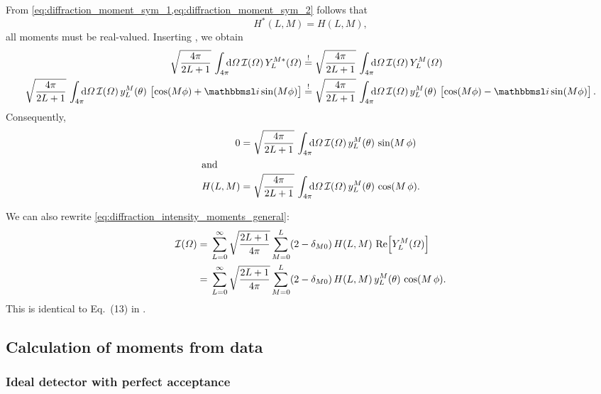 From \cref{eq:diffraction_moment_sym_1,eq:diffraction_moment_sym_2} follows that
\begin{equation}
  H^*(L, M) = H(L, M),
\end{equation}
\ie all moments must be real-valued.  Inserting
, we obtain
\begin{align}
  \sqrt{\frac{4 \pi}{2 L + 1}}\, \int_{4 \pi}\!\!\! \dif{\Omega}\, \mathcal{I}(\Omega)\, Y_L^{M *}(\Omega)
  \mustBeEq{}&
  \sqrt{\frac{4 \pi}{2 L + 1}}\, \int_{4 \pi}\!\!\! \dif{\Omega}\, \mathcal{I}(\Omega)\, Y_L^M(\Omega) \\
  \sqrt{\frac{4 \pi}{2 L + 1}}\, \int_{4 \pi}\!\!\! \dif{\Omega}\, \mathcal{I}(\Omega)\, y_L^M(\theta)\, \sBrk{\cos(M \phi) + \imag \sin(M \phi)}
  \mustBeEq{}&
  \sqrt{\frac{4 \pi}{2 L + 1}}\, \int_{4 \pi}\!\!\! \dif{\Omega}\, \mathcal{I}(\Omega)\, y_L^M(\theta)\, \sBrk{\cos(M \phi) - \imag \sin(M \phi)}.
\end{align}
Consequently,
\begin{align}
  \label{eq:diffraction_moments_imag}
  0
  ={}& \sqrt{\frac{4 \pi}{2 L + 1}}\, \int_{4 \pi}\!\!\! \dif{\Omega}\, \mathcal{I}(\Omega)\, y_L^M(\theta)\, \sin(M\, \phi) \\
  \intertext{and}
  \label{eq:diffraction_moments_real}
  H(L, M)
  ={}& \sqrt{\frac{4 \pi}{2 L + 1}}\, \int_{4 \pi}\!\!\! \dif{\Omega}\, \mathcal{I}(\Omega)\, y_L^M(\theta)\, \cos(M\, \phi).
\end{align}

We can also rewrite \cref{eq:diffraction_intensity_moments_general}:
\begin{align}
  \mathcal{I}(\Omega)
  ={}& \sum_{L = 0}^\infty \sqrt{\frac{2 L + 1}{4 \pi}} \sum_{M = 0}^{L} (2 - \delta_{M 0})\, H(L, M)\, \Re{Y_L^M(\Omega)} \notag
  \\
  \label{eq:diffraction_intensity_moments_real}
  ={}& \sum_{L = 0}^\infty \sqrt{\frac{2 L + 1}{4 \pi}} \sum_{M = 0}^{L} (2 - \delta_{M 0})\, H(L, M)\, y_L^M(\theta)\, \cos(M\, \phi).
\end{align}
This is identical to Eq.~(13) in .


\subsection{Calculation of moments from data}%
\label{sec:diffraction:moments_data}

\subsubsection{Ideal detector with perfect acceptance}%
\label{sec:diffraction:moments_data_no_acc}

